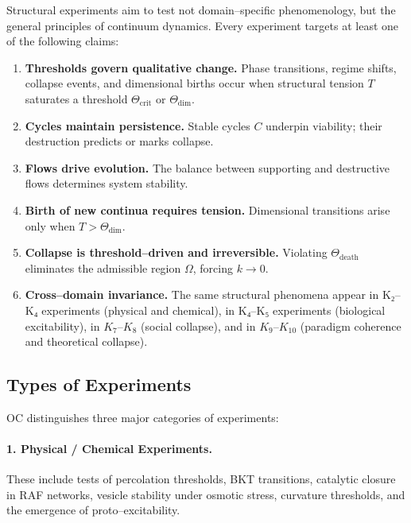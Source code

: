 Structural experiments aim to test not domain–specific phenomenology, but the
general principles of continuum dynamics.
Every experiment targets at least one of the following claims:

\begin{enumerate}
    \item \textbf{Thresholds govern qualitative change.}
          Phase transitions, regime shifts, collapse events, and dimensional
          births occur when structural tension $T$ saturates a threshold
          $\Theta_{\mathrm{crit}}$ or $\Theta_{\mathrm{dim}}$.

    \item \textbf{Cycles maintain persistence.}
          Stable cycles $C$ underpin viability; their destruction predicts or
          marks collapse.

    \item \textbf{Flows drive evolution.}
          The balance between supporting and destructive flows determines
          system stability.

    \item \textbf{Birth of new continua requires tension.}
          Dimensional transitions arise only when $T > \Theta_{\mathrm{dim}}$.

    \item \textbf{Collapse is threshold–driven and irreversible.}
          Violating $\Theta_{\mathrm{death}}$ eliminates the admissible region
          $\Omega$, forcing $k\to 0$.

    \item \textbf{Cross–domain invariance.}
          The same structural phenomena appear in K₂–K₄ experiments (physical
          and chemical), in K₄–K₅ experiments (biological excitability), in
          $K_7$–$K_8$ (social collapse), and in $K_9$–$K_{10}$ (paradigm coherence and
          theoretical collapse).
\end{enumerate}


\subsection{Types of Experiments}

OC distinguishes three major categories of experiments:

\paragraph{1. Physical / Chemical Experiments.}
These include tests of percolation thresholds, BKT transitions, catalytic
closure in RAF networks, vesicle stability under osmotic stress, curvature
thresholds, and the emergence of proto–excitability.

